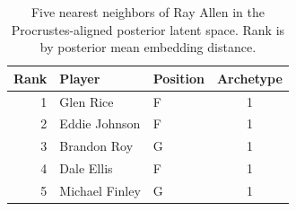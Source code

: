 \begin{table}[htbp]
  \centering\small
  \begin{tabular}{rllc}
    \toprule
    Rank & Player & Position & Archetype \\
    \midrule
    1 & Glen Rice & F & 1 \\
    2 & Eddie Johnson & F & 1 \\
    3 & Brandon Roy & G & 1 \\
    4 & Dale Ellis & F & 1 \\
    5 & Michael Finley & G & 1 \\
    \bottomrule
  \end{tabular}
  \caption{Five nearest neighbors of Ray Allen in the Procrustes-aligned posterior latent space. Rank is by posterior mean embedding distance.}
  \label{tab:Ray_Allen_neighbors}
\end{table}

